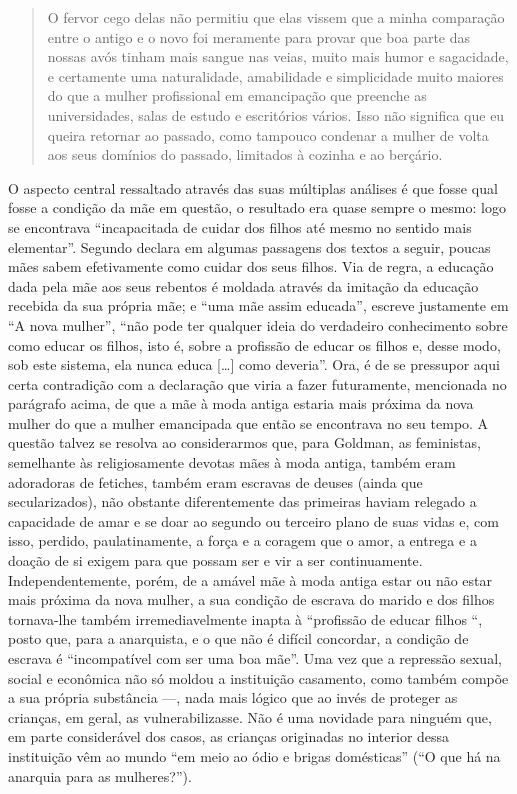 \begin{quote}
O fervor cego delas não permitiu que elas vissem que a minha comparação
entre o antigo e o novo foi meramente para provar que boa parte das
nossas avós tinham mais sangue nas veias, muito mais humor e sagacidade,
e certamente uma naturalidade, amabilidade e simplicidade muito maiores
do que a mulher profissional em emancipação que preenche as
universidades, salas de estudo e escritórios vários. Isso não significa
que eu queira retornar ao passado, como tampouco condenar a mulher de
volta aos seus domínios do passado, limitados à cozinha e ao berçário.
\end{quote}

O aspecto central ressaltado através das suas múltiplas análises é que
fosse qual fosse a condição da mãe em questão, o resultado era quase
sempre o mesmo: logo se encontrava ``incapacitada de cuidar dos filhos
até mesmo no sentido mais elementar''. Segundo declara em algumas
passagens dos textos a seguir, poucas mães sabem efetivamente como
cuidar dos seus filhos. Via de regra, a educação dada pela mãe aos seus
rebentos é moldada através da imitação da educação recebida da sua
própria mãe; e ``uma mãe assim educada'', escreve justamente em ``A nova
mulher'', ``não pode ter qualquer ideia do verdadeiro conhecimento sobre
como educar os filhos, isto é, sobre a profissão de educar os filhos e,
desse modo, sob este sistema, ela nunca educa {[}\ldots{]} como deveria''.
Ora, é de se pressupor aqui certa contradição com a declaração que viria
a fazer futuramente, mencionada no parágrafo acima, de que a mãe à moda
antiga estaria mais próxima da nova mulher do que a mulher emancipada
que então se encontrava no seu tempo. A questão talvez se resolva ao
considerarmos que, para Goldman, as feministas, semelhante às
religiosamente devotas mães à moda antiga, também eram adoradoras de
fetiches, também eram escravas de deuses (ainda que secularizados), não
obstante diferentemente das primeiras haviam relegado a capacidade de
amar e se doar ao segundo ou terceiro plano de suas vidas e, com isso,
perdido, paulatinamente, a força e a coragem que o amor, a entrega e a
doação de si exigem para que possam ser e vir a ser continuamente.
Independentemente, porém, de a amável mãe à moda antiga estar ou não
estar mais próxima da nova mulher, a sua condição de escrava do marido e
dos filhos tornava-lhe também irremediavelmente inapta à ``profissão de
educar filhos ``, posto que, para a anarquista, e o que não é difícil
concordar, a condição de escrava é ``incompatível com ser uma boa mãe''.
Uma vez que a repressão sexual, social e econômica não só moldou a
instituição casamento, como também compõe a sua própria substância ---,
nada mais lógico que ao invés de proteger as crianças, em geral, as
vulnerabilizasse. Não é uma novidade para ninguém que, em parte
considerável dos casos, as crianças originadas no interior dessa
instituição vêm ao mundo ``em meio ao ódio e brigas domésticas'' (``O
que há na anarquia para as mulheres?'').

